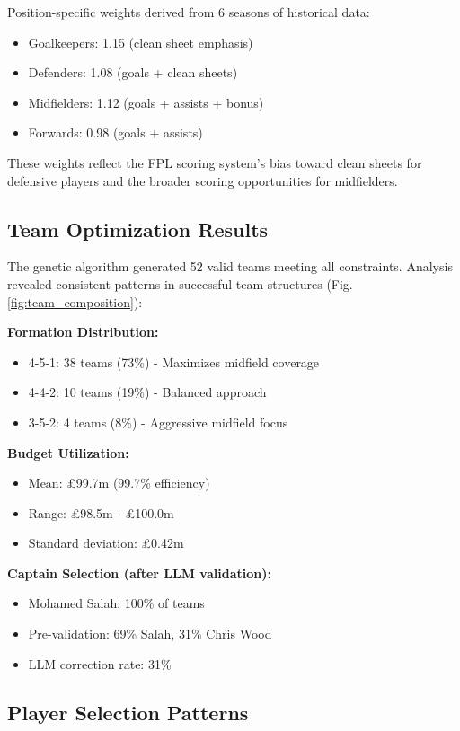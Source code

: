 \documentclass[10pt,a4paper,twocolumn]{article}
\begin{document}
Position-specific weights derived from 6 seasons of historical data:
\begin{itemize}
\item Goalkeepers: 1.15 (clean sheet emphasis)
\item Defenders: 1.08 (goals + clean sheets)
\item Midfielders: 1.12 (goals + assists + bonus)
\item Forwards: 0.98 (goals + assists)
\end{itemize}

These weights reflect the FPL scoring system's bias toward clean sheets for defensive players and the broader scoring opportunities for midfielders.

\subsection*{Team Optimization Results}

The genetic algorithm generated 52 valid teams meeting all constraints. Analysis revealed consistent patterns in successful team structures (Fig. \ref{fig:team_composition}):

\textbf{Formation Distribution:}
\begin{itemize}
\item 4-5-1: 38 teams (73\%) - Maximizes midfield coverage
\item 4-4-2: 10 teams (19\%) - Balanced approach
\item 3-5-2: 4 teams (8\%) - Aggressive midfield focus
\end{itemize}

\textbf{Budget Utilization:}
\begin{itemize}
\item Mean: £99.7m (99.7\% efficiency)
\item Range: £98.5m - £100.0m
\item Standard deviation: £0.42m
\end{itemize}

\textbf{Captain Selection (after LLM validation):}
\begin{itemize}
\item Mohamed Salah: 100\% of teams
\item Pre-validation: 69\% Salah, 31\% Chris Wood
\item LLM correction rate: 31\%
\end{itemize}

\subsection*{Player Selection Patterns}
\end{document}
